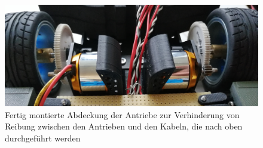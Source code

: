 \begin{figure}[H] %
\includegraphics[width=.90\textwidth]{sec2/images/3DAnbaukomponenten/Montagebilder/AntriebsabdeckungMontage} 
\centering
\captionsetup{width=.9\textwidth}
\caption[Fertig montierte Abdeckung der Antriebe]{Fertig montierte Abdeckung der Antriebe zur Verhinderung von Reibung zwischen den Antrieben und den Kabeln, die nach oben durchgeführt werden}
\centering
\label{fig:MontageAntriebsabdeckung}
\end{figure}

\newpage
